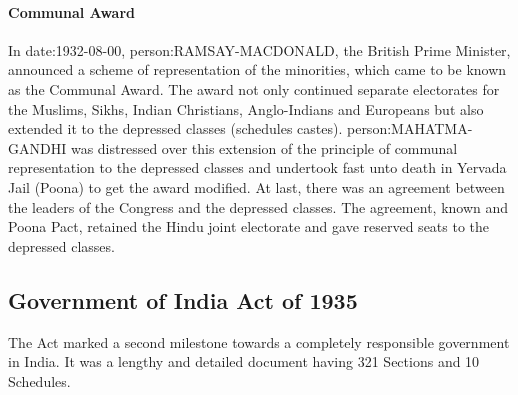 \begin{multicols}{2}
\paragraph{Communal Award}
In \gls{date:1932-08-00}, \gls{person:RAMSAY-MACDONALD}, the British Prime Minister, announced a scheme of representation of the minorities, which came to be known as the Communal Award. The award not only continued separate electorates for the Muslims, Sikhs, Indian Christians, Anglo-Indians and Europeans but also extended it to the depressed classes (schedules castes). \gls{person:MAHATMA-GANDHI} was distressed over this extension of the principle of communal representation to the depressed classes and undertook fast unto death in Yervada Jail (Poona) to get the award modified. At last, there was an agreement between the leaders of the Congress and the depressed classes. The agreement, known and Poona Pact, retained the Hindu joint electorate and gave reserved seats to the depressed classes.


\subsection{Government of India Act of 1935}
The Act marked a second milestone towards a completely responsible government in India. It was a lengthy and detailed document having 321 Sections and 10 Schedules.


\end{multicols}
